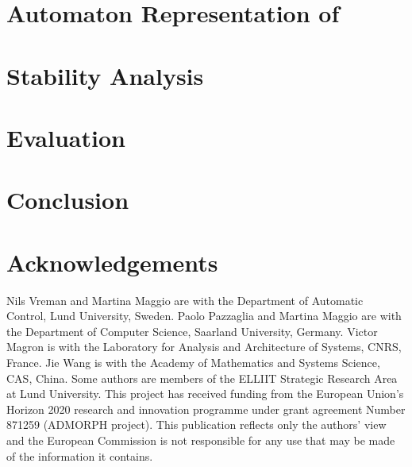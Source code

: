 \section{Automaton Representation of \ewhc{}}
\label{sec:state-machine}


\section{Stability Analysis}
\label{sec:stability}


\section{Evaluation}
\label{sec:evaluation}


\section{Conclusion}
\label{sec:conclusion}


\section*{Acknowledgements}
Nils Vreman and Martina Maggio are with the Department of Automatic Control, Lund University, Sweden.
Paolo Pazzaglia and Martina Maggio are with the Department of Computer Science, Saarland University, Germany.
Victor Magron is with the Laboratory for Analysis and Architecture of Systems, CNRS, France.
Jie Wang is with the Academy of Mathematics and Systems Science, CAS, China.
Some authors are members of the ELLIIT Strategic Research Area at Lund University.
This project has received funding from the European Union's Horizon 2020 research and innovation programme under grant agreement Number 871259 (ADMORPH project).
This publication reflects only the authors' view and the European Commission is not responsible for any use that may be made of the information it contains.



\printbibliography[heading=subbibliography]
